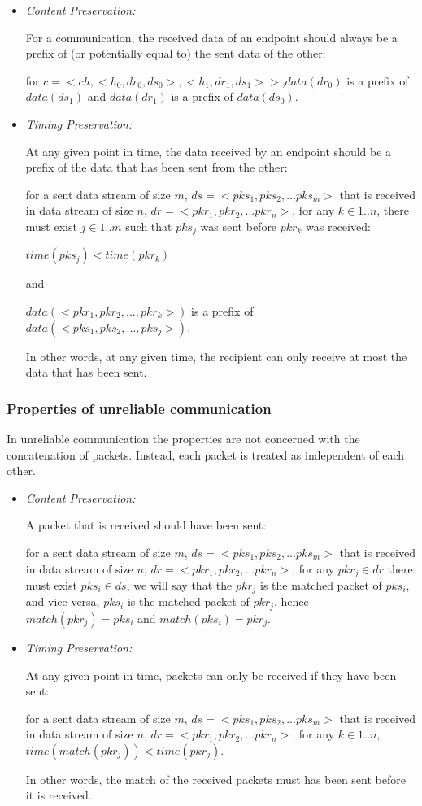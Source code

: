 \begin{itemize}
 \item \textit{Content Preservation:} 
 
For a communication, the received data of an endpoint should always be a prefix of (or potentially equal to) the sent data of the other:

for $c = <ch, <h_0, dr_0, ds_0>, <h_1, dr_1, ds_1>>$,$data(dr_0)$ is a prefix of $data(ds_1)$ and $data(dr_1)$ is a prefix of $data(ds_0)$.

 \item \textit{Timing Preservation:} 
 
At any given point in time, the data received by an endpoint should be a prefix of the data that has been sent from the other:
 
for a sent data stream of size $m$, $ds= <pks_1, pks_2, ... pks_m>$ that is received in data stream of size $n$, $dr = <pkr_1, pkr_2, ... pkr_n>$, for any $k \in {1..n}$, there must exist $j \in {1..m}$ such that $pks_j$ was sent before $pkr_k$ was received:

$time(pks_j) < time(pkr_k)$

and

$ data(<pkr_1, pkr_2, ..., pkr_k>)$ is a prefix of $data(<pks_1, pks_2, ..., pks_j>)$.

In other words, at any given time, the recipient can only receive at most the data that has been sent.

\end{itemize}

\subsubsection{Properties of unreliable communication}\label{unreliablepro}
In unreliable communication the properties are not concerned with the concatenation of packets. Instead, each packet is treated as independent of each other.
\begin{itemize}
 \item \textit{ Content Preservation:} 

A packet that is received should have been sent:

for a sent data stream of size $m$, $ds= <pks_1, pks_2, ... pks_m>$ that is received in data stream of size $n$, $dr = <pkr_1, pkr_2, ... pkr_n>$,  for any $pkr_j \in dr$ there must exist $pks_i \in ds$, we will say that the $pkr_j$ is the matched packet of $pks_i$, and vice-versa, $pks_i$ is the matched packet of $pkr_j$, hence $match(pkr_j) = pks_i$  and $match(pks_i) = pkr_j$.

 \item \textit{Timing Preservation:}  
 
At any given point in time, packets can only be received if they have been sent:

for a sent data stream of size $m$, $ds= <pks_1, pks_2, ... pks_m>$ that is received in data stream of size $n$, $dr = <pkr_1, pkr_2, ... pkr_n>$, for any $k \in {1..n}$, $time(match(pkr_j)) < time(pkr_j)$.

In other words, the match of the received packets must has been sent before it is received.
\end{itemize}



